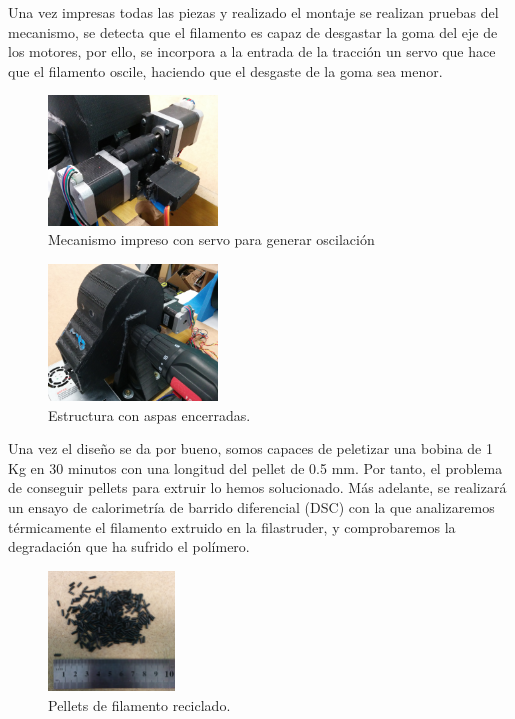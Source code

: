 Una vez impresas todas las piezas y realizado el montaje se realizan pruebas del mecanismo, se detecta que el filamento es capaz de desgastar la goma del eje de los motores, por ello, se incorpora a la entrada de la tracción un servo que hace que el filamento oscile, haciendo que el desgaste de la goma sea menor.

\begin{figure}[H]
    \centering
    \includegraphics[width=0.4\textwidth]{images/peletizadora/IMG_20150818_172903.jpg}
    \caption{Mecanismo impreso con servo para generar oscilación}
    \label{fig:peletizadora_mecanismo}
\end{figure}

\begin{figure}[H]
    \centering
    \includegraphics[width=0.4\textwidth]{images/peletizadora/IMG_20150818_172917.jpg}
    \caption{Estructura con aspas encerradas.}
    \label{fig:peletizadora_mecanismo2}
\end{figure}

Una vez el diseño se da por bueno, somos capaces de peletizar una bobina de 1 Kg en 30 minutos con una longitud del pellet de 0.5 mm. Por tanto, el problema de conseguir pellets para extruir lo hemos solucionado. Más adelante, se realizará un ensayo de calorimetría de barrido diferencial (DSC) con la que analizaremos térmicamente el filamento extruido en la filastruder, y comprobaremos la degradación que ha sufrido el polímero.
    
\begin{figure}[H]
    \centering
    \includegraphics[width=0.3\textwidth]{images/peletizadora/IMG_20150819_112740.jpg}
    \caption{Pellets de filamento reciclado.}
    \label{fig:peletizadora_pellets_reciclados}
\end{figure}
